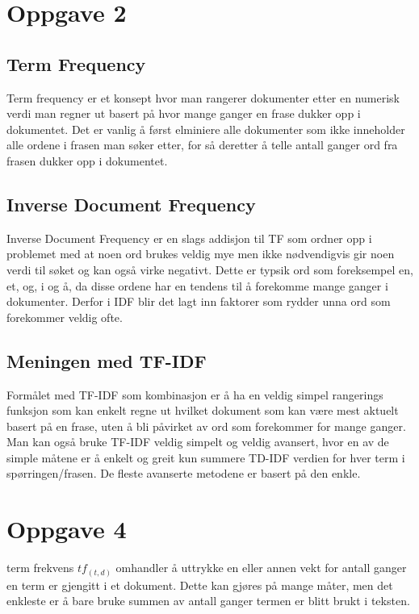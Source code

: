 \documentclass[]{article}
\begin{document}
\section{Oppgave 2}

\subsection{Term Frequency}
Term frequency er et konsept hvor man rangerer dokumenter etter en numerisk verdi man regner ut basert på hvor mange ganger en frase dukker opp i dokumentet. Det er vanlig å først elminiere alle dokumenter som ikke inneholder alle ordene i frasen man søker etter, for så deretter å telle antall ganger ord fra frasen dukker opp i dokumentet.
\subsection{Inverse Document Frequency}
Inverse Document Frequency er en slags addisjon til TF som ordner opp i problemet med at noen ord brukes veldig mye men ikke nødvendigvis gir noen verdi til søket og kan også virke negativt. Dette er typsik ord som foreksempel en, et, og, i og å, da disse ordene har en tendens til å forekomme mange ganger i dokumenter. Derfor i IDF blir det lagt inn faktorer som rydder unna ord som forekommer veldig ofte.

\subsection{Meningen med TF-IDF}
Formålet med TF-IDF som kombinasjon er å ha en veldig simpel rangerings funksjon som kan enkelt regne ut hvilket dokument som kan være mest aktuelt basert på en frase, uten å bli påvirket av ord som forekommer for mange ganger. 
Man kan også bruke TF-IDF veldig simpelt og veldig avansert, hvor en av de simple måtene er å enkelt og greit kun summere TD-IDF verdien for hver term i spørringen/frasen. De fleste avanserte metodene er basert på den enkle.

\pagebreak
\section{Oppgave 4}

\vspace{10 mm}

term frekvens $tf_{(t,d)}$ omhandler å uttrykke en eller annen vekt for antall ganger en term er gjengitt i et dokument. Dette kan gjøres på mange måter, men det enkleste er å bare bruke summen av antall ganger termen er blitt brukt i teksten.
\vspace{5 mm}
\end{document}
